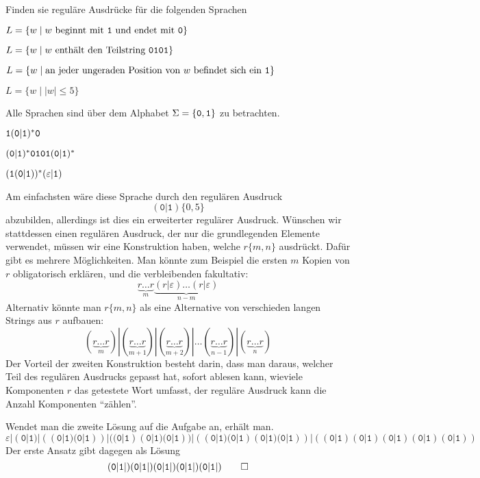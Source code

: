 Finden sie reguläre Ausdrücke für die folgenden Sprachen
\begin{teilaufgaben}
\item $L=\{w\;|\;\text{$w$ beginnt mit {\tt 1} und endet mit {\tt 0}}\}$
\item $L=\{w\;|\;\text{$w$ enthält den Teilstring {\tt 0101}}\}$
\item $L=\{w\;|\;\text{an jeder ungeraden Position von $w$ befindet sich ein {\tt 1}}\}$
\item $L=\{w\;|\;|w|\le 5\}$
\end{teilaufgaben}
Alle Sprachen sind über dem Alphabet $\Sigma=\{{\tt 0},{\tt 1}\}$ zu
betrachten.


\begin{loesung}
\begin{teilaufgaben}
\item ${\tt 1}({\tt 0}|{\tt 1})^*{\tt 0}$
\item $({\tt 0}|{\tt 1})^* {\tt 0101} ({\tt 0}|{\tt 1})^*$
\item $({\tt 1}({\tt 0}|{\tt 1}))^*(\varepsilon|{\tt 1})$
\item
Am einfachsten wäre diese Sprache durch den regulären Ausdruck 
\[
(\texttt{0}|\texttt{1})\{0,5\}
\]
abzubilden, allerdings ist dies ein erweiterter regulärer Ausdruck.
Wünschen wir stattdessen einen regulären Ausdruck, der nur die
grundlegenden Elemente verwendet, müssen wir eine Konstruktion haben,
welche $r\{m,n\}$ ausdrückt. Dafür gibt es mehrere Möglichkeiten.
Man könnte zum Beispiel die ersten $m$ Kopien von $r$ obligatorisch
erklären, und die verbleibenden fakultativ:
\[
\underbrace{r\dots r}_m\underbrace{(r|\varepsilon)\dots(r|\varepsilon)}_{n-m}
\]
Alternativ könnte man $r\{m,n\}$ als eine Alternative von verschieden langen
Strings aus $r$ aufbauen:
\[
(\underbrace{r\dots r}_m)|
(\underbrace{r\dots r}_{m+1})|
(\underbrace{r\dots r}_{m+2})|\dots
(\underbrace{r\dots r}_{n - 1})|
(\underbrace{r\dots r}_{n})
\]
Der Vorteil der zweiten Konstruktion besteht darin, dass man daraus, welcher
Teil des regulären Ausdrucks gepasst hat, sofort ablesen kann, wieviele
Komponenten $r$ das getestete Wort umfasst, der reguläre Ausdruck kann
die Anzahl Komponenten ``zählen''.

Wendet man die zweite Lösung auf die Aufgabe an, erhält man.
\[
\varepsilon|
(\texttt{0}|\texttt{1})|
((\texttt{0}|\texttt{1}) (\texttt{0}|\texttt{1}))|
((\texttt{0}|\texttt{1}) (\texttt{0}|\texttt{1}) (\texttt{0}|\texttt{1}))|
((\texttt{0}|\texttt{1}) (\texttt{0}|\texttt{1}) (\texttt{0}|\texttt{1}) (\texttt{0}|\texttt{1}))|
((\texttt{0}|\texttt{1}) (\texttt{0}|\texttt{1}) (\texttt{0}|\texttt{1}) (\texttt{0}|\texttt{1}) (\texttt{0}|\texttt{1}))
\]
Der erste Ansatz gibt dagegen als Lösung
\[
(\texttt{0}|\texttt{1}|)
(\texttt{0}|\texttt{1}|)
(\texttt{0}|\texttt{1}|)
(\texttt{0}|\texttt{1}|)
(\texttt{0}|\texttt{1}|)
\qedhere
\]
\end{teilaufgaben}
\end{loesung}
